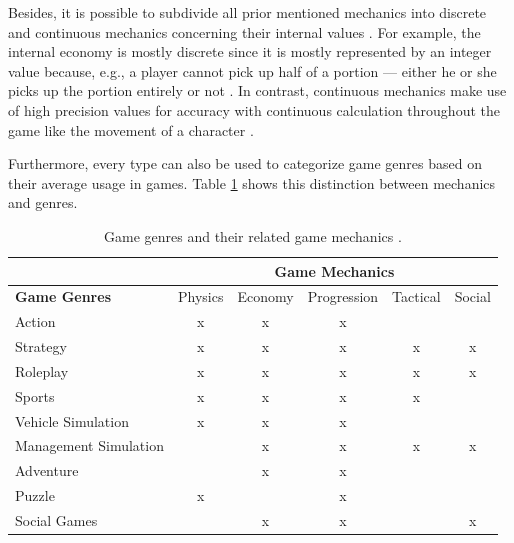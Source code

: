 \documentclass[MGS,Master,english]{twbook}%
\begin{document}
Besides, it is possible to subdivide all prior mentioned mechanics into discrete and continuous mechanics concerning their internal values \cite{gameDesign::gameMechanicsAdvancedGameDesign}. For example, the internal economy is mostly discrete since it is mostly represented by an integer value because, e.g., a player cannot pick up half of a portion — either he or she picks up the portion entirely or not \cite{gameDesign::gameMechanicsAdvancedGameDesign}. In contrast, continuous mechanics make use of high precision values for accuracy with continuous calculation throughout the game like the movement of a character \cite{gameDesign::gameMechanicsAdvancedGameDesign}. 

Furthermore, every type can also be used to categorize game genres based on their average usage in games. Table \ref{GameMechanicsToGenre} shows this distinction between mechanics and genres.
\begin{table}[!ht]
	\centering
	{%
		\begin{tabular}{l||c|c|c|c|c|}
			\cline{2-6}
			& \multicolumn{5}{c|}{\textbf{Game Mechanics}}        \\ \hline 
			\multicolumn{1}{|l||}{\textbf{Game Genres}}  & Physics & Economy & Progression & Tactical & Social \\ \hline \hline
			\multicolumn{1}{|l||}{Action}                & x       & x       & x           &          &        \\ \hline
			\multicolumn{1}{|l||}{Strategy}              & x       & x       & x           & x        & x      \\ \hline
			\multicolumn{1}{|l||}{Roleplay}              & x       & x       & x           & x        & x      \\ \hline
			\multicolumn{1}{|l||}{Sports}                & x       & x       & x           & x        &        \\ \hline
			\multicolumn{1}{|l||}{Vehicle Simulation}    & x       & x       & x           &          &        \\ \hline
			\multicolumn{1}{|l||}{Management Simulation} &         & x       & x           & x        & x      \\ \hline
			\multicolumn{1}{|l||}{Adventure}             &         & x       & x           &          &        \\ \hline
			\multicolumn{1}{|l||}{Puzzle}                & x       &         & x           &          &        \\ \hline
			\multicolumn{1}{|l||}{Social Games}          &         & x       & x           &          & x      \\ \hline
		\end{tabular}%
	}
	\caption{Game genres and their related game mechanics \protect\cite{gameDesign::gameMechanicsAdvancedGameDesign}.}
	\label{GameMechanicsToGenre}
\end{table}
\end{document}
